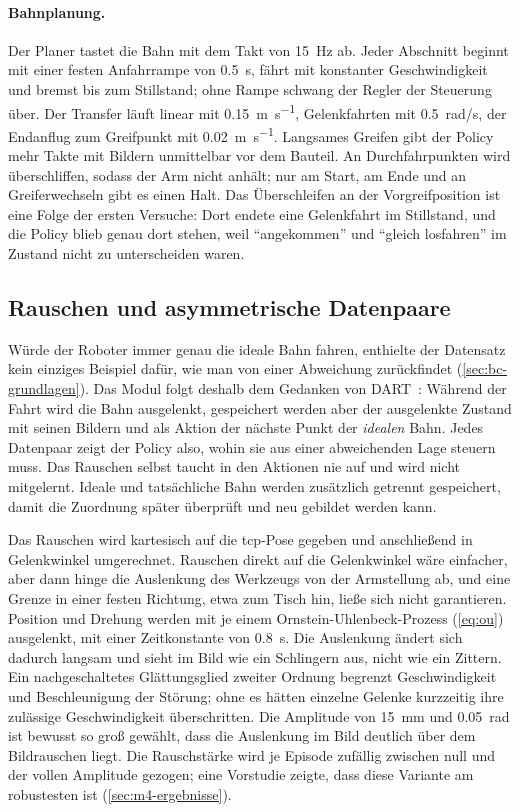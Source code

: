 \paragraph{Bahnplanung.} Der Planer tastet die Bahn mit dem Takt von \SI{15}{\hertz} ab. Jeder
Abschnitt beginnt mit einer festen Anfahrrampe von \SI{0.5}{\second}, fährt mit konstanter
Geschwindigkeit und bremst bis zum Stillstand; ohne Rampe schwang der Regler der Steuerung über.
Der Transfer läuft linear mit \SI{0.15}{\metre\per\second}, Gelenkfahrten mit
\SI{0.5}{rad/s}, der Endanflug zum Greifpunkt mit \SI{0.02}{\metre\per\second}. Langsames
Greifen gibt der Policy mehr Takte mit Bildern unmittelbar vor dem Bauteil. An Durchfahrpunkten
wird überschliffen, sodass der Arm nicht anhält; nur am Start, am Ende und an Greiferwechseln
gibt es einen Halt. Das Überschleifen an der Vorgreifposition ist eine Folge der ersten Versuche:
Dort endete eine Gelenkfahrt im Stillstand, und die Policy blieb genau dort stehen, weil
\enquote{angekommen} und \enquote{gleich losfahren} im Zustand nicht zu unterscheiden waren.

\subsection{Rauschen und asymmetrische Datenpaare}

Würde der Roboter immer genau die ideale Bahn fahren, enthielte der Datensatz kein einziges
Beispiel dafür, wie man von einer Abweichung zurückfindet (\cref{sec:bc-grundlagen}). Das Modul
folgt deshalb dem Gedanken von DART~\cite{laskey2017}: Während der Fahrt wird die Bahn
ausgelenkt, gespeichert werden aber der ausgelenkte Zustand mit seinen Bildern und als Aktion der
nächste Punkt der \emph{idealen} Bahn. Jedes Datenpaar zeigt der Policy also, wohin sie aus einer
abweichenden Lage steuern muss. Das Rauschen selbst taucht in den Aktionen nie auf und wird nicht
mitgelernt. Ideale und tatsächliche Bahn werden zusätzlich getrennt gespeichert, damit die
Zuordnung später überprüft und neu gebildet werden kann.

Das Rauschen wird kartesisch auf die \ac{tcp}-Pose gegeben und anschließend in Gelenkwinkel
umgerechnet. Rauschen direkt auf die Gelenkwinkel wäre einfacher, aber dann hinge die Auslenkung
des Werkzeugs von der Armstellung ab, und eine Grenze in einer festen Richtung, etwa zum Tisch
hin, ließe sich nicht garantieren. Position und Drehung werden mit je einem
Ornstein-Uhlenbeck-Prozess (\cref{eq:ou}) ausgelenkt, mit einer Zeitkonstante von
\SI{0.8}{\second}. Die Auslenkung ändert sich dadurch langsam und sieht im Bild wie ein
Schlingern aus, nicht wie ein Zittern. Ein nachgeschaltetes Glättungsglied zweiter Ordnung
begrenzt Geschwindigkeit und Beschleunigung der Störung; ohne es hätten einzelne Gelenke
kurzzeitig ihre zulässige Geschwindigkeit überschritten. Die Amplitude von \SI{15}{\milli\metre}
und \SI{0.05}{rad} ist bewusst so groß gewählt, dass die Auslenkung im Bild deutlich über dem
Bildrauschen liegt. Die Rauschstärke wird je Episode zufällig zwischen null und der vollen
Amplitude gezogen; eine Vorstudie zeigte, dass diese Variante am robustesten ist
(\cref{sec:m4-ergebnisse}).

